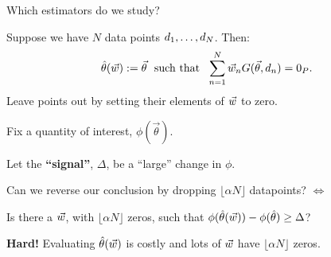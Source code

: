 

\begin{frame}[t]{Which estimators do we study?}

Suppose we have $N$ data points $d_{1}, \ldots, d_{N}$.  Then:
%
\begin{align*}
%
\thetahat(\w) :=
\vec\theta \,\, \textrm{ such that } \,\,
\sumn
\w_{n} G(\vec\theta, \d_{n}) =  \zP .
%
\end{align*}
%
Leave points out by setting their elements of $\vec{w}$ to zero.

\hrulefill

%
Fix a quantity of interest, $\phi(\vec\theta)$.

Let the \textbf{``signal''}, $\Delta$, be a ``large'' change in $\phi$.

\hrulefill

Can we reverse our conclusion by dropping $\lfloor \alpha N \rfloor$
datapoints? \pause
$\Leftrightarrow$

Is there a $\vec{w}$, with
$\lfloor \alpha N \rfloor$ zeros, such that
$\phi(\hat{\theta}(\vec{w})) - \phi(\hat{\theta}) \ge \Delta$?

\textbf{Hard!}
Evaluating $\hat{\theta}(\vec{w})$ is costly and lots of $\vec{w}$
have $\lfloor \alpha N \rfloor$ zeros.


\end{frame}




